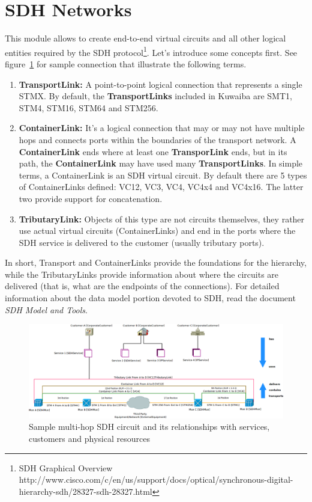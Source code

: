 \documentclass[a4paper]{article}
\begin{document}
	\section{SDH Networks}
		This module allows to create end-to-end virtual circuits and all other logical entities required by the SDH protocol\footnote{SDH Graphical Overview http://www.cisco.com/c/en/us/support/docs/optical/synchronous-digital-hierarchy-sdh/28327-sdh-28327.html}. Let's introduce some concepts first. See figure~\ref{fig:sdh_module_description} for sample connection that illustrate the following terms.
		\begin{enumerate}
			\item \textbf{TransportLink:} A point-to-point logical connection that represents a single STMX. By default, the \textbf{TransportLinks} included in Kuwaiba are SMT1, STM4, STM16, STM64 and STM256.
			\item \textbf{ContainerLink:} It's a  logical connection that may or may not have multiple hops and connects ports within the boundaries of the transport network. A \textbf{ContainerLink} ends where at least one \textbf{TransporLink} ends, but in its path, the \textbf{ContainerLink} may have used many \textbf{TransportLinks}. In simple terms, a ContainerLink is an SDH virtual circuit. By default there are 5 types of ContainerLinks defined: VC12, VC3, VC4, VC4x4 and VC4x16. The latter two provide support for concatenation.
			\item \textbf{TributaryLink:} Objects of this type are not circuits themselves, they rather use actual virtual circuits (ContainerLinks) and end in the ports where the SDH service is delivered to the customer (usually tributary ports).
		\end{enumerate}
		In short, Transport and ContainerLinks provide the foundations for the hierarchy, while the TributaryLinks provide information about where the circuits are delivered (that is, what are the endpoints of the connections). For detailed information about the data model portion devoted to SDH, read the document \textit{SDH Model and Tools}.
		\newpage
		\begin{landscape}
			\begin{figure}
				\centering
				\includegraphics[width=\linewidth]{img/sdh_module_description.png}
				\caption{Sample multi-hop SDH circuit and its relationships with services, customers and physical resources}
				\label{fig:sdh_module_description}
			\end{figure}
		\end{landscape}
\end{document}
